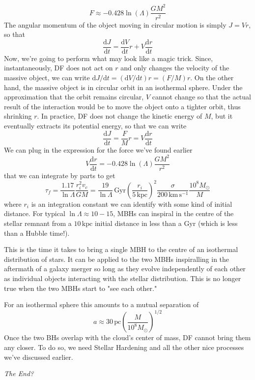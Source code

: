 \begin{equation*}
    F \approx -0.428 \ln(\Lambda)\frac{GM^{2}}{r^{2}}
\end{equation*}
The angular momentum of the object moving in circular motion is simply $J = Vr$, so that
\begin{equation*}
    \frac{\text{d}J}{\text{d}t} = \frac{\text{d}V}{\text{d}t}r + V\frac{\text{d}r}{\text{d}t}
\end{equation*}
Now, we're going to perform what may look like a magic trick. Since, instantaneously, DF does not act on $r$ and only changes the velocity of the massive object, we can write $\text{d}J/\text{d}t = (\text{d}V/\text{d}t)r = (F/M)r$. On the other hand, the massive object is in circular orbit in an isothermal sphere. Under the approximation that the orbit remains circular, $V$ cannot change so that the actual result of the interaction would be to move the object onto a tighter orbit, thus shrinking $r$. In practice, DF does not change the kinetic energy of $M$, but it eventually extracts its potential energy,
so that we can write
\begin{equation*}
     \frac{\text{d}J}{\text{d}t} = \frac{F}{M}r = V \frac{\text{d}r}{\text{d}t}
\end{equation*}
We can plug in the expression for the force we've found earlier 
\begin{equation*}
    V \frac{\text{d}r}{\text{d}t} = -0.428 \ln(\Lambda)\frac{GM^{2}}{r^{2}}
\end{equation*}
that we can integrate by parts to get
\begin{equation}
    \tau_{f} = \frac{1.17}{\ln\Lambda}\frac{r^{2}_{i}v_{c}}{GM} = \frac{19}{\ln\Lambda}\,\text{Gyr}\left(\frac{r_{i}}{5\,\text{kpc}}\right)^{2}\frac{\sigma}{200\,\text{km}\,\text{s}^{-1}}\frac{10^{8}M_{\odot}}{M}
    \label{eq:df_timescale}
\end{equation}
where $r_{i}$ is an integration constant we can identify with some kind of initial distance. For typical $\ln\Lambda\approx 10-15$, MBHs can inspiral in the centre of the stellar remnant from a $10\,\text{kpc}$ initial distance in less than a Gyr (which is less than a Hubble time!).
\par This is the time it takes to bring a single MBH to the centre of an isothermal distribution of stars. It can be applied to the two MBHs inspiralling in the aftermath of a galaxy merger so long as they evolve independently of each other as individual objects interacting with the stellar distribution. This is no longer true when the two MBHs start to "see each other."
\par For an isothermal sphere this amounts to a mutual separation of 
\begin{equation*}
    a \approx 30\,\text{pc} \left(\frac{M}{10^{8}M_{\odot}}\right)^{1/2}
\end{equation*}
Once the two BHs overlap with the cloud's center of mass, DF cannot bring them any closer. To do so, we need Stellar Hardening and all the other nice processes we've discussed earlier.
\begin{flushright}
    \emph{The End?}
\end{flushright}